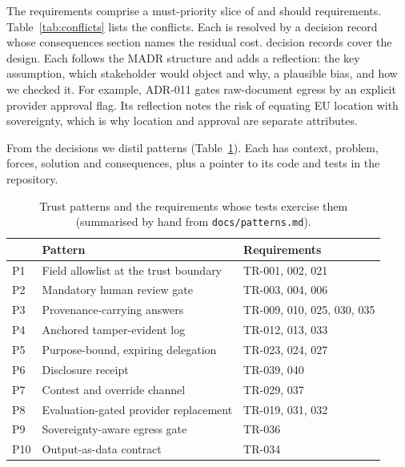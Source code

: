 \documentclass[10pt,twocolumn]{article}
\begin{document}
The \NReq{} requirements comprise a must-priority slice of \NMust{} and \NShould{} should requirements. Table~\ref{tab:conflicts} lists the \NConflictsWord{} conflicts. Each is resolved by a decision record whose consequences section names the residual cost. \NDecisions{} decision records cover the design. Each follows the MADR structure and adds a reflection: the key assumption, which stakeholder would object and why, a plausible bias, and how we checked it. For example, ADR-011 gates raw-document egress by an explicit provider approval flag. Its reflection notes the risk of equating EU location with sovereignty, which is why location and approval are separate attributes.



From the decisions we distil \NPatternsWord{} patterns (Table~\ref{tab:patterns}). Each has context, problem, forces, solution and consequences, plus a pointer to its code and tests in the repository.

\begin{table}[t]
\centering\small
\caption{Trust patterns and the requirements whose tests exercise them (summarised by hand from \texttt{docs/patterns.md}).}\label{tab:patterns}
\begin{tabularx}{\columnwidth}{@{}lXl@{}}
\toprule
 & Pattern & Requirements\\
\midrule
P1 & Field allowlist at the trust boundary & TR-001, 002, 021\\
P2 & Mandatory human review gate & TR-003, 004, 006\\
P3 & Provenance-carrying answers & TR-009, 010, 025, 030, 035\\
P4 & Anchored tamper-evident log & TR-012, 013, 033\\
P5 & Purpose-bound, expiring delegation & TR-023, 024, 027\\
P6 & Disclosure receipt & TR-039, 040\\
P7 & Contest and override channel & TR-029, 037\\
P8 & Evaluation-gated provider replacement & TR-019, 031, 032\\
P9 & Sovereignty-aware egress gate & TR-036\\
P10 & Output-as-data contract & TR-034\\
\bottomrule
\end{tabularx}
\end{table}
\end{document}
